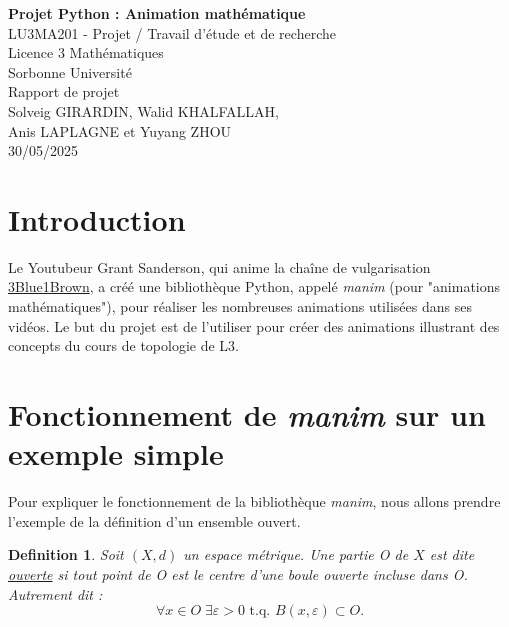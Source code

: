 \documentclass[12pt,a4paper,twoside]{article}
\newtheorem{Definition}[Theorem]{Definition}%
\numberwithin{equation}{section}
\begin{document}
  \pagestyle{empty}

\begin{titlepage}
    \begin{center}

    \vspace*{1cm}
    {\Large \textbf{Projet Python : Animation mathématique}}\\[1.5cm]

    {\large  LU3MA201 - Projet / Travail d'étude et de recherche}\\
    {\large  Licence 3 Mathématiques}\\
    {\large  Sorbonne Université}\\[2cm]

    {\Large Rapport de projet}\\[2cm]

    {\large Solveig GIRARDIN, Walid KHALFALLAH,\\ Anis LAPLAGNE et Yuyang ZHOU}\\[1cm]
    {\large 30/05/2025}\\[3cm]

 \end{center}
\end{titlepage}

\clearpage
\tableofcontents
\newpage

\pagestyle{fancy}

\section{Introduction}
Le Youtubeur Grant Sanderson, qui anime la chaîne de vulgarisation
\href{https://www.youtube.com/3Blue1Brown}{3Blue1Brown}, a créé une bibliothèque
Python, appelé \textit{manim} (pour "animations mathématiques"), pour réaliser
les nombreuses animations utilisées dans ses vidéos. Le but du projet est de
l'utiliser pour créer des animations illustrant des concepts du cours de
topologie de L3.

\clearpage
\section{Fonctionnement de \textit{manim} sur un  exemple simple}
Pour expliquer le fonctionnement de la bibliothèque \textit{manim}, nous allons
prendre l'exemple de la définition d'un ensemble ouvert. 
\begin{Definition}
Soit $(X,d)$ un espace métrique. Une partie O de $X$ est dite
\underline{ouverte} si tout point de O est le centre d'une boule ouverte incluse
dans O. Autrement dit :
$$\forall x \in O \;\exists \varepsilon > 0 \text{ t.q. } B(x,\varepsilon) \subset O.$$
\end{Definition}
\end{document}
